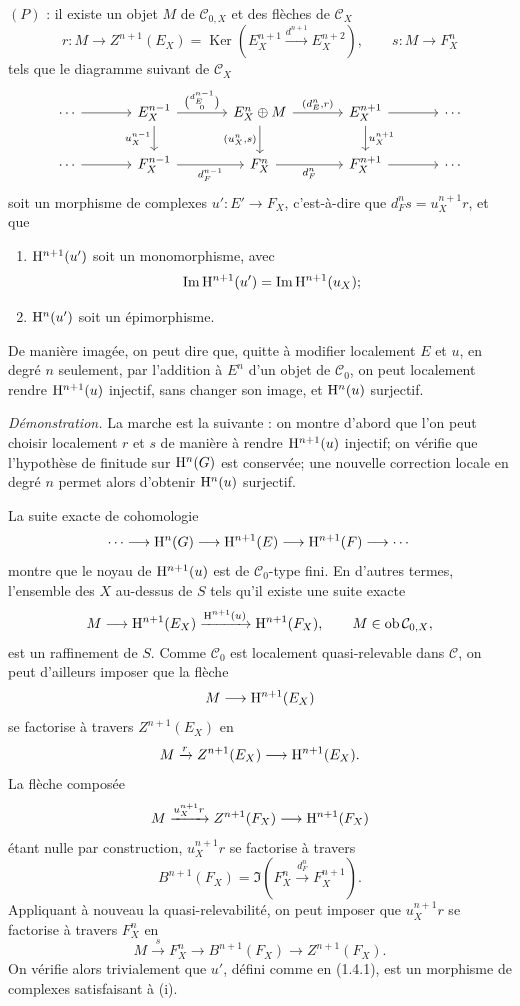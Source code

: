 \documentclass[11pt]{article}
\providecommand{\Ker}{\operatorname{Ker}}
\begin{document}
\((P)\) : il existe un objet \(M\) de \(\mathcal C_{0,X}\) et des flèches de \(\mathcal C_X\)
\[
  r:M\longrightarrow Z^{n+1}(E_X)=
  \Ker\!\left(E_X^{n+1}\xrightarrow{d^{n+1}}E_X^{n+2}\right),
  \qquad
  s:M\longrightarrow F_X^n
\]
tels que le diagramme suivant de \(\mathcal C_X\)
\[
\begin{tikzcd}[column sep=large]
\cdots \arrow[r] & E_X^{n-1}
 \arrow[r,"{\binom{d_E^{n-1}}{0}}"]
 \arrow[d,"u_X^{n-1}"'] &
E_X^n\oplus M
 \arrow[r,"{(d_E^n,r)}"]
 \arrow[d,"{(u_X^n,s)}"'] &
E_X^{n+1} \arrow[r] \arrow[d,"u_X^{n+1}"] &
\cdots\\
\cdots \arrow[r] & F_X^{n-1} \arrow[r,"d_F^{n-1}"'] &
F_X^n \arrow[r,"d_F^n"'] &
F_X^{n+1} \arrow[r] &
\cdots
\end{tikzcd}
\]
soit un morphisme de complexes \(u':E'\to F_X\), c'est-à-dire que \(d_F^n s=u_X^{n+1}r\), et que
\begin{enumerate}[label=(\roman*)]
\item \(\mathrm H^{n+1}(u')\) soit un monomorphisme, avec
\[
  \operatorname{Im}\mathrm H^{n+1}(u')=\operatorname{Im}\mathrm H^{n+1}(u_X);
\]
\item \(\mathrm H^n(u')\) soit un épimorphisme.
\end{enumerate}

De manière imagée, on peut dire que, quitte à modifier localement \(E\) et \(u\), en degré \(n\) seulement, par l'addition à \(E^n\) d'un objet de \(\mathcal C_0\), on peut localement rendre \(\mathrm H^{n+1}(u)\) injectif, sans changer son image, et \(\mathrm H^n(u)\) surjectif.

\emph{Démonstration.} La marche est la suivante : on montre d'abord que l'on peut choisir localement \(r\) et \(s\) de manière à rendre \(\mathrm H^{n+1}(u)\) injectif; on vérifie que l'hypothèse de finitude sur \(\mathrm H^n(G)\) est conservée; une nouvelle correction locale en degré \(n\) permet alors d'obtenir \(\mathrm H^n(u)\) surjectif.

La suite exacte de cohomologie
\[
  \cdots\longrightarrow \mathrm H^n(G)\longrightarrow
  \mathrm H^{n+1}(E)\longrightarrow
  \mathrm H^{n+1}(F)\longrightarrow \cdots
\]
montre que le noyau de \(\mathrm H^{n+1}(u)\) est de \(\mathcal C_0\)-type fini. En d'autres termes, l'ensemble des \(X\) au-dessus de \(S\) tels qu'il existe une suite exacte
\[
  M\longrightarrow \mathrm H^{n+1}(E_X)
  \xrightarrow{\mathrm H^{n+1}(u)}
  \mathrm H^{n+1}(F_X),
  \qquad M\in\operatorname{ob}\mathcal C_{0,X},
\]
est un raffinement de \(S\). Comme \(\mathcal C_0\) est localement quasi-relevable dans \(\mathcal C\), on peut d'ailleurs imposer que la flèche
\[
  M\longrightarrow \mathrm H^{n+1}(E_X)
\]
se factorise à travers \(Z^{n+1}(E_X)\) en
\[
  M\xrightarrow{r}Z^{n+1}(E_X)\longrightarrow \mathrm H^{n+1}(E_X).
\]
La flèche composée
\[
  M\xrightarrow{u_X^{n+1}r}Z^{n+1}(F_X)\longrightarrow \mathrm H^{n+1}(F_X)
\]
étant nulle par construction, \(u_X^{n+1}r\) se factorise à travers
\[
  B^{n+1}(F_X)=\Im\!\left(F_X^n\xrightarrow{d_F^n}F_X^{n+1}\right).
\]
Appliquant à nouveau la quasi-relevabilité, on peut imposer que \(u_X^{n+1}r\) se factorise à travers \(F_X^n\) en
\[
  M\xrightarrow{s}F_X^n\longrightarrow B^{n+1}(F_X)\longrightarrow Z^{n+1}(F_X).
\]
On vérifie alors trivialement que \(u'\), défini comme en (1.4.1), est un morphisme de complexes satisfaisant à (i).
\end{document}
